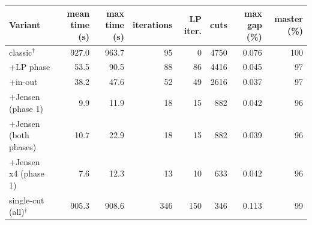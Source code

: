 \begin{tabular}{@{}lrrrrrrr@{}}\toprule
Variant & mean time (s) & max time (s) & iterations & LP iter. & cuts & max gap (\%) & master (\%) \\ \midrule
classic$^\dagger$ & 927.0 & 963.7 & 95 & 0 & 4750 & 0.076 & 100 \\
+LP phase & 53.5 & 90.5 & 88 & 86 & 4416 & 0.045 & 97 \\
+in-out & 38.2 & 47.6 & 52 & 49 & 2616 & 0.037 & 97 \\
+Jensen (phase 1) & 9.9 & 11.9 & 18 & 15 & 882 & 0.042 & 96 \\
+Jensen (both phases) & 10.7 & 22.9 & 18 & 15 & 882 & 0.039 & 96 \\
+Jensen x4 (phase 1) & 7.6 & 12.3 & 13 & 10 & 633 & 0.042 & 96 \\
single-cut (all)$^\dagger$ & 905.3 & 908.6 & 346 & 150 & 346 & 0.113 & 99 \\
\bottomrule\end{tabular}
